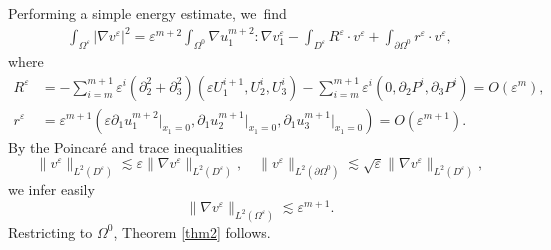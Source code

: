 \documentclass[10pt]{amsart}
\theoremstyle{plain}
\theoremstyle{definition}
\let\pa\partial
\let\na\nabla
\let\eps\varepsilon
\begin{document}
Performing a simple energy estimate, we~find
\begin{align*}
\int_{\Omega^\eps} |\na v^\eps|^2 = \eps^{m+2} \int_{\Omega^0} \na u_1^{m+2} : \na v_1^\eps - \int_{D^\eps} R^\eps \cdot v^\eps + \int_{\pa \Omega^0} r^\eps \cdot v^\eps,
\end{align*}
where
\begin{align*}
R^\eps & = - \sum_{i=m}^{m+1} \eps^i (\pa^2_2 + \pa^2_3) (\eps U^{i+1}_1,U^i_2,U^i_3) - \sum_{i=m}^{m+1} \eps^i (0, \pa_2 P^i, \pa_3 P^i) = O(\eps^m), \\
r^\eps & = \eps^{m+1}(\eps \pa_1 u^{m+2}_1\vert_{x_1=0},\pa_1 u^{m+1}_2\vert_{x_1=0}, \pa_1 u^{m+1}_3\vert_{x_1=0}) = O(\eps^{m+1}).
\end{align*}
By the Poincaré and trace inequalities
\[
\| v^\eps \|_{L^2(D^\eps)} \lesssim \eps \|\na v^\eps \|_{L^2(D^\eps)}, \quad \| v^\eps \|_{L^2(\pa\Omega^0)} \lesssim \sqrt{\eps} \|\na v^\eps \|_{L^2(D^\eps)},
\]
we infer easily
\[
\|\na v^\eps \|_{L^2(\Omega^\eps)} \lesssim \eps^{m+1}.
\]
Restricting to $\Omega^0$, Theorem \ref{thm2} follows.
\end{document}
